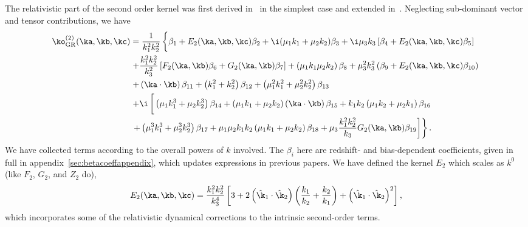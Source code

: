 The relativistic part of the second order kernel was first derived in~\cite{Umeh:2016nuh} in the simplest case and extended in~\cite{Jolicoeur:2017nyt,Jolicoeur:2017eyi,Jolicoeur:2018blf}. Neglecting sub-dominant vector and tensor contributions, we have 
\begin{align}\label{eq:soGRkernel}
\ko_\mathrm{GR}^{(2)}(\ka,\kb,\kc) &= \frac{1}{k_1^2 k_2^2} \left\{ \vphantom{\frac{k_1^2 k_2^2}{k_3}} \beta_1 + E_2(\ka,\kb,\kc) \beta_2 
+\i (\mu_1k_1+\mu_2k_2)\beta_3
+ \i \mu_3 k_3\left[ \beta_{4} + E_2(\ka, \kb, \kc)\beta_{5}\right] \right. \nonumber \\
&\left. +\frac{k_1^2 k_2^2}{k_3^2} \left[ F_2(\ka,\kb) \beta_{6} + G_2(\ka,\kb) \beta_{7} \right] + \left( \mu_1 k_1 \mu_2 k_2 \right)\beta_{8} + \mu_3^2 k_3^2 \left(\beta_{9} + E_2(\ka,\kb,\kc) \beta_{10} \right) \right. \nonumber \\
&\left. + \left(\ka \cdot \kb \right)\beta_{11} + \left( k_1^2 + k_2^2 \right) \beta_{12} + \left( \mu_1^2 k_1^2 + \mu_2^2 k_2^2 \right) \beta_{13} \right. \nonumber \\
&\left. + \i \left[\vphantom{\frac{k_1^2 k_2^2}{k_3}} \left( \mu_1 k_1^3 + \mu_2 k_2^3 \right)\beta_{14} + \left( \mu_1 k_1 + \mu_2 k_2 \right) \left(\ka\cdot\kb \right) \beta_{15} + k_1 k_2 \left(\mu_1 k_2 + \mu_2 k_1 \right) \beta_{16} \right. \right. \nonumber \\
&\left. \left. + \left( \mu_1^3 k_1^3 + \mu_2^3 k_2^3 \right)\beta_{17} + \mu_1 \mu_2 k_1 k_2 \left( \mu_1 k_1 + \mu_2 k_2 \right) \beta_{18} + \mu_3 \frac{k_1^2 k_2^2}{k_3} G_2(\ka,\kb) \beta_{19} \right] \right\}.
\end{align}
We have collected terms according to the overall powers of $k$ involved.
The \(\beta_i\) here are redshift- and bias-dependent coefficients, given in full in appendix~\ref{sec:betacoeffappendix}, which updates  expressions in previous papers.
We have defined the kernel \(E_2\) which scales as \(k^0\) (like \(F_2\), \(G_2\), and \(Z_2\) do), 
\begin{equation}
E_2(\ka,\kb,\kc) = \frac{k_1^2 k_2^2}{k_3^4} \left[ 3 + 2 \left( \hat{\k}_1 \cdot\hat{\k}_2 \right) \left( \frac{k_1}{k_2} + \frac{k_2}{k_1} \right) + \left( \hat{\k}_1 \cdot \hat{\k}_2 \right)^2 \right],
\end{equation}
which incorporates some of the relativistic dynamical corrections to the intrinsic second-order terms.

